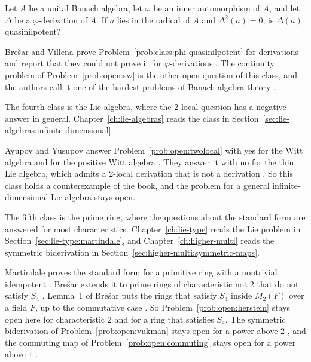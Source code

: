 \begin{problem}\label{prob:class:phi-quasinilpotent}
Let $A$ be a unital Banach algebra, let $\varphi$ be an inner automorphism of
$A$, and let $\Delta$ be a $\varphi$-derivation of $A$.
If $a$ lies in the radical of $A$ and $\Delta^2(a)=0$, is $\Delta(a)$
quasinilpotent?
\end{problem}

Bre\v{s}ar and Villena prove Problem~\ref{prob:class:phi-quasinilpotent} for
derivations and report that they could not prove it for $\varphi$-derivations
\cite[Remark~5.3, p.~720]{BresarVillena2002}.
The continuity problem of Problem~\ref{prob:open:sw} is the other open question
of this class, and the authors call it one of the hardest problems of Banach
algebra theory \cite[p.~710]{BresarVillena2002}.

The fourth class is the Lie algebra, where the 2-local question has a negative
answer in general.
Chapter~\ref{ch:lie-algebras} reads the class in
Section~\ref{sec:lie-algebras:infinite-dimensional}. %

Ayupov and Yusupov answer Problem~\ref{prob:open:twolocal} with yes for the Witt
algebra \cite[Theorem~4.1, p.~4]{AyupovYusupov2020} and for the positive Witt
algebra \cite[Theorem~4.4, p.~6]{AyupovYusupov2020}.
They answer it with no for the thin Lie algebra, which admits a 2-local
derivation that is not a derivation \cite[Theorem~4.8, p.~8]{AyupovYusupov2020}.
So this class holds a counterexample of the book, and the problem for a
general infinite-dimensional Lie algebra stays open.

The fifth class is the prime ring, where the questions about the standard form
are answered for most characteristics.
Chapter~\ref{ch:lie-type} reads the Lie problem in
Section~\ref{sec:lie-type:martindale}, and Chapter~\ref{ch:higher-multi} reads
the symmetric biderivation in Section~\ref{sec:higher-multi:symmetric-maps}. %

Martindale proves the standard form for a primitive ring with a nontrivial
idempotent \cite[Theorem~2, p.~187]{Martindale1964}.
Bre\v{s}ar extends it to prime rings of characteristic not $2$ that do not
satisfy $S_4$ \cite[Theorem~5, p.~529]{Bresar1993LieTAMS}.
Lemma~1 of Bre\v{s}ar puts the rings that satisfy $S_4$ inside $M_2(F)$ over a
field $F$, up to the commutative case
\cite[Lemma~1, p.~530]{Bresar1993LieTAMS}.
So Problem~\ref{prob:open:herstein} stays open here for characteristic $2$ and
for a ring that satisfies $S_4$.
The symmetric biderivation of Problem~\ref{prob:open:vukman} stays open for a
power above $2$ \cite[pp.~188--189]{Vukman1990Two}, and the commuting map of
Problem~\ref{prob:open:commuting} stays open for a power above $1$
\cite[p.~334]{LeeTK1997Centralizing}.


